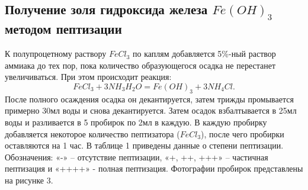 \documentclass[a4paper, 12pt]{article}
\begin{document}
\subsection{Получение золя гидроксида железа $Fe(OH)_{3}$ методом пептизации}
К полупроцетному раствору $FeCl_{3}$ по каплям добавляется 5\%-ный раствор аммиака до тех пор, пока количество
образующегося осадка не перестанет увеличиваться. При этом происходит реакция:
$$FeCl_{3} + 3 NH_{3} H_{2}O = Fe(OH)_{3} + 3NH_{4}Cl.$$
После полного осаждения осадка он декантируется, затем трижды промывается примерно 30мл воды и снова декантируется. Затем осадок взбалтывается в 25мл воды и разливается в 5 пробирок по 2мл в каждую. В каждую пробирку добавляется некоторое количество пептизатора ($FeCl_{3}$), после чего пробирки оставляются на 1 час. В таблице 1 приведены данные о степени пептизации. Обозначения: «-» – отсутствие пептизации, «+, ++, +++» – частичная
пептизация и «++++» - полная пептизация. Фотографии пробирок представлены на рисунке 3.
\end{document}
